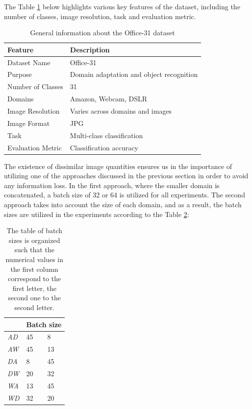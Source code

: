 The Table \ref{tab:features} below highlights various key features of the dataset, including the number of classes, image resolution, task and evaluation metric.

\begin{table}[h]
\centering
\caption{General information about the Office-31 dataset}
\label{tab:features}
\begin{tabular}{|l|l|}
\hline
\textbf{Feature}  & \textbf{Description}                     \\ \hline
Dataset Name      & Office-31                                \\ \hline
Purpose           & Domain adaptation and object recognition \\ \hline
Number of Classes & 31                                       \\ \hline
Domains           & Amazon, Webcam, DSLR                     \\ \hline
Image Resolution  & Varies across domains and images         \\ \hline
Image Format      & JPG                                     \\ \hline
Task              & Multi-class classification               \\ \hline
Evaluation Metric & Classification accuracy                  \\ \hline
\end{tabular}
\end{table}

The existence of dissimilar image quantities ensures us in the importance of utilizing one of the approaches discussed in the previous section in order to avoid any information loss. In the first approach, where the smaller domain is concatenated, a batch size of 32 or 64 is utilized for all experiments. The second approach takes into account the size of each domain, and as a result, the batch sizes are utilized in the experiments according to the Table \ref{tab:batchsizes}:

\begin{table}[H]
\centering
\caption{The table of batch sizes is organized such that the numerical values in the first column correspond to the first letter, the second one to the second letter.}
\label{tab:batchsizes}
\begin{tabular}{|p{1.5cm}|p{1.5cm}|p{1.5cm}|}
\hline
   & \multicolumn{2}{l|}{Batch size} \\ \hline
\textit{AD} & 45   & 8   \\ \hline
\textit{AW} & 45   & 13  \\ \hline
\textit{DA} & 8    & 45  \\ \hline
\textit{DW} & 20   & 32  \\ \hline
\textit{WA} & 13   & 45  \\ \hline
\textit{WD} & 32   & 20  \\ \hline
\end{tabular}
\end{table}

